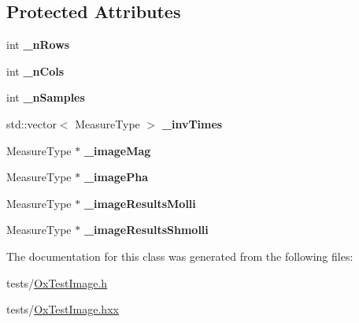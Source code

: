 \subsection*{Protected Attributes}
\begin{DoxyCompactItemize}
\item 
\hypertarget{class_ox_1_1_test_image_a2fca989633ec429545fefe579641eeb3}{int {\bfseries \-\_\-n\-Rows}}\label{class_ox_1_1_test_image_a2fca989633ec429545fefe579641eeb3}

\item 
\hypertarget{class_ox_1_1_test_image_aede6d17394f5b1d7aee6287c17482bed}{int {\bfseries \-\_\-n\-Cols}}\label{class_ox_1_1_test_image_aede6d17394f5b1d7aee6287c17482bed}

\item 
\hypertarget{class_ox_1_1_test_image_a0b2de27b3ba5865c071a754c34e86bc7}{int {\bfseries \-\_\-n\-Samples}}\label{class_ox_1_1_test_image_a0b2de27b3ba5865c071a754c34e86bc7}

\item 
\hypertarget{class_ox_1_1_test_image_a9a3283dccb1476d113836134c3479328}{std\-::vector$<$ Measure\-Type $>$ {\bfseries \-\_\-inv\-Times}}\label{class_ox_1_1_test_image_a9a3283dccb1476d113836134c3479328}

\item 
\hypertarget{class_ox_1_1_test_image_aa6d8862446566b0f1bc313de05cedd28}{Measure\-Type $\ast$ {\bfseries \-\_\-image\-Mag}}\label{class_ox_1_1_test_image_aa6d8862446566b0f1bc313de05cedd28}

\item 
\hypertarget{class_ox_1_1_test_image_a108ccefc1c986d4ad3265ec5601841c5}{Measure\-Type $\ast$ {\bfseries \-\_\-image\-Pha}}\label{class_ox_1_1_test_image_a108ccefc1c986d4ad3265ec5601841c5}

\item 
\hypertarget{class_ox_1_1_test_image_aa942d21740af38bc720db46a77fcea6c}{Measure\-Type $\ast$ {\bfseries \-\_\-image\-Results\-Molli}}\label{class_ox_1_1_test_image_aa942d21740af38bc720db46a77fcea6c}

\item 
\hypertarget{class_ox_1_1_test_image_abab3b898dade1792c251df511357be13}{Measure\-Type $\ast$ {\bfseries \-\_\-image\-Results\-Shmolli}}\label{class_ox_1_1_test_image_abab3b898dade1792c251df511357be13}

\end{DoxyCompactItemize}


The documentation for this class was generated from the following files\-:\begin{DoxyCompactItemize}
\item 
tests/\hyperlink{_ox_test_image_8h}{Ox\-Test\-Image.\-h}\item 
tests/\hyperlink{_ox_test_image_8hxx}{Ox\-Test\-Image.\-hxx}\end{DoxyCompactItemize}
